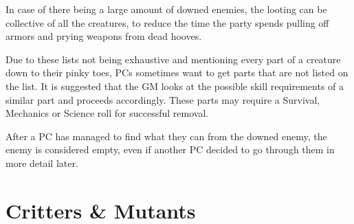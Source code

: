 \documentclass[11pt,a4paper,twocolumn]{book}
\begin{document}
	In case of there being a large amount of downed enemies, the looting can be collective of all the creatures, to reduce the time the party spends pulling off armors and prying weapons from dead hooves.
	
	Due to these lists not being exhaustive and mentioning every part of a creature down to their pinky toes, PCs sometimes want to get parts that are not listed on the list. It is suggested that the GM looks at the possible skill requirements of a similar part and proceeds accordingly. These parts may require a Survival, Mechanics or Science roll for successful removal.
	
	After a PC has managed to find what they can from the downed enemy, the enemy is considered empty, even if another PC decided to go through them in more detail later.
	
	\onecolumn
	
	
	\chapter{Critters \& Mutants}
	
\end{document}
